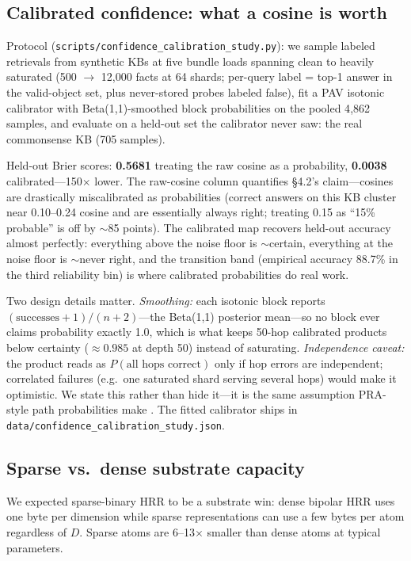 \documentclass[11pt]{article}
\begin{document}
\subsection{Calibrated confidence: what a cosine is worth}
\label{sec:calibration}

Protocol (\texttt{scripts/confidence\_calibration\_study.py}): we
sample labeled retrievals from synthetic KBs at five bundle loads
spanning clean to heavily saturated (500 $\to$ 12{,}000 facts at 64
shards; per-query label = top-1 answer in the valid-object set, plus
never-stored probes labeled false), fit a PAV isotonic calibrator
with Beta(1,1)-smoothed block probabilities on the pooled 4{,}862
samples, and evaluate on a held-out set the calibrator never saw:
the real commonsense KB (705 samples).

Held-out Brier scores: \textbf{0.5681} treating the raw cosine as a
probability, \textbf{0.0038} calibrated---150$\times$ lower. The raw-cosine column
quantifies \S4.2's claim---cosines are drastically miscalibrated as
probabilities (correct answers on this KB cluster near 0.10--0.24
cosine and are essentially always right; treating 0.15 as ``15\%
probable'' is off by $\sim$85 points). The calibrated map recovers
held-out accuracy almost perfectly: everything above the noise floor
is $\sim$certain, everything at the noise floor is $\sim$never
right, and the transition band (empirical accuracy 88.7\% in the
third reliability bin) is where calibrated probabilities do real
work.

Two design details matter. \emph{Smoothing:} each isotonic block
reports $(\text{successes} + 1)/(n + 2)$---the Beta(1,1) posterior
mean---so no block ever claims probability exactly 1.0, which is
what keeps 50-hop calibrated products below certainty
($\approx 0.985$ at depth 50) instead of saturating.
\emph{Independence caveat:} the product reads as
$P(\text{all hops correct})$ only if hop errors are independent;
correlated failures (e.g.\ one saturated shard serving several hops)
would make it optimistic. We state this rather than hide it---it is
the same assumption PRA-style path probabilities make
\cite{lao2010pra}. The fitted calibrator ships in
\texttt{data/confidence\_calibration\_study.json}.

\subsection{Sparse vs.\ dense substrate capacity}

We expected sparse-binary HRR to be a substrate win: dense bipolar
HRR uses one byte per dimension while sparse representations can
use a few bytes per atom regardless of $D$. Sparse atoms are
6--13$\times$ smaller than dense atoms at typical parameters.
\end{document}

